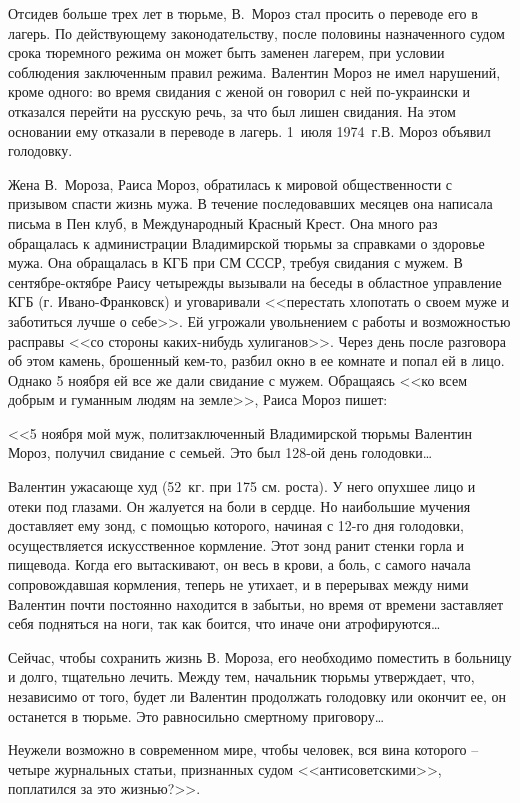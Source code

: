 \documentclass{book}
\begin{document}
Отсидев больше трех лет в тюрьме, В.~Мороз стал просить о переводе его в лагерь. По действующему законодательству, после половины назначенного судом срока тюремного режима он может быть заменен лагерем, при условии соблюдения заключенным правил режима. Валентин Мороз не имел нарушений, кроме одного: во время свидания с женой он говорил с ней по-украински и отказался перейти на русскую речь, за что был лишен свидания. На этом основании ему отказали в переводе в лагерь. 1~июля 1974~г.В. Мороз объявил голодовку.

Жена В.~Мороза, Раиса Мороз, обратилась к мировой общественности с призывом спасти жизнь мужа. В течение последовавших месяцев она написала письма в Пен клуб, в Международный Красный Крест. Она много раз обращалась к администрации Владимирской тюрьмы за справками о здоровье мужа. Она обращалась в КГБ при СМ СССР, требуя свидания с мужем. В сентябре-октябре Раису четырежды вызывали на бесе­ды в областное управление КГБ (г. Ивано-Франковск) и уговаривали <<перестать хлопотать о своем муже и заботиться лучше о себе>>. Ей угрожали увольнением с работы и возможностью расправы <<со стороны каких-нибудь хулиганов>>. Через день после разговора об этом камень, брошенный кем-то, разбил окно в ее комнате и попал ей в лицо. Однако 5 ноября ей все же дали свидание с мужем. Обращаясь <<ко всем добрым и гуманным людям на земле>>, Раиса Мороз пишет:

<<5 ноября мой муж, политзаключенный Владимирской тюрьмы Валентин Мороз, получил свидание с семьей. Это был 128-ой день голодовки\ldots

Валентин ужасающе худ (52~кг. при 175 см. роста). У него опухшее лицо и отеки под глазами. Он жалуется на боли в сердце. Но наибольшие мучения доставляет ему зонд, с помощью которого, начиная с 12-го дня голодовки, осуществляется искусственное кормление. Этот зонд ранит стенки горла и пищевода. Когда его вытаскивают, он весь в крови, а боль, с самого начала сопровождавшая кормления, теперь не утихает, и в перерывах между ними Валентин почти постоянно находится в забытьи, но время от времени заставляет себя подняться на ноги, так как боится, что иначе они атрофируются\ldots

Сейчас, чтобы сохранить жизнь В. Мороза, его необходимо поместить в больницу и долго, тщательно лечить. Между тем, начальник тюрьмы утверждает, что, независимо от того, будет ли Валентин продолжать голодовку или окончит ее, он останется в тюрьме. Это равносильно смертному приговору\ldots

Неужели возможно в современном мире, чтобы человек, вся вина которого -- четыре журнальных статьи, признанных судом <<антисоветскими>>, поплатился за это жизнью?>>.
\end{document}
